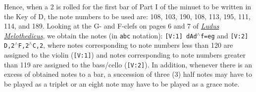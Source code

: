 \documentclass[a4paper,x11names,svgnames,10pt]{article}
\begin{document}
{Hence, when a 2 is rolled for the first bar of Part I of the minuet to be written in the Key of D, the note numbers to be used are: 108, 103, 190, 108, 113, 195, 111, 114, and 189.  Looking at the G- and F-clefs on pages 6 and 7 of \href{https://imslp.org/wiki/Ludus_Melothedicus_(Anonymous)}{{\em Ludus Melothedicus}}, we obtain the notes (in {\tt abc} notation): {\tt [V:1] dAd$^\wedge$f=eg} and {\tt [V:2] D,2$^\wedge$F,2$^\wedge$C,2}, where notes corresponding to note numbers less than 120 are assigned to the violin ({\tt [V:1]}) and notes corresponding to note numbers greater than 119 are assigned to the bass/cello ({\tt [V:2]}).  In addition, whenever there is an excess of obtained notes to a bar, a succession of three (3) half notes may have to be played as a triplet or an eight note may have to be played as a grace note.

}
\end{document}
